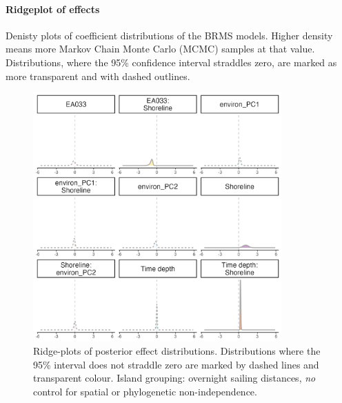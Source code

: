 \documentclass[unnumsec,webpdf,modern,medium]{oup-authoring-template}
\begin{document}
\FloatBarrier
\paragraph{Ridgeplot of effects}
\label{appendix_supp_figs_ridges}
Denisty plots of coefficient distributions of the BRMS models. Higher density means more Markov Chain Monte Carlo (MCMC) samples at that value. Distributions, where the 95\% confidence interval straddles zero, are marked as more transparent and with dashed outlines.

\begin{figure}[ht]
\includegraphics[width=0.85\textwidth]{brms_SBZR_control_none_group_full_effect_ridge_panels_plot.png}
\caption{Ridge-plots of posterior effect distributions. Distributions where the 95\% interval does not straddle zero are marked by dashed lines and transparent colour. Island grouping: overnight sailing distances, \emph{no} control for spatial or phylogenetic non-independence.}
\label{brms_SBZR_control_none_group_full_effect_ridge_panels_plot}
\end{figure}
\end{document}

